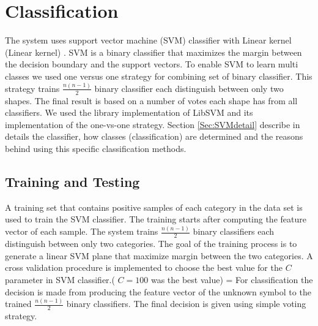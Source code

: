 \section{Classification}%
\label{sec:Classification}
The system uses support vector machine (SVM) classifier with Linear kernel (Linear kernel) \cite{libsvm}. SVM is a binary classifier that maximizes the margin between the decision boundary and the support vectors. To enable SVM to learn multi classes we used one versus one strategy for combining set of binary classifier. This strategy trains $ \frac{n(n-1)}{{2}}$ binary classifier each distinguish between only two shapes. The final result is based on a number of votes each shape has from all classifiers. We used the library implementation of LibSVM \cite{libsvm} and its implementation of the one-vs-one strategy. Section \ref{Sec:SVMdetail} describe in details the classifier, how classes (classification) are determined and the reasons behind using this specific classification methods.

\subsection {Training and Testing}
A training set that contains positive samples of each category in the data set is used to train the SVM classifier.  The training starts after computing the feature vector of each sample. The system trains $ \frac{n(n-1)}{{2}}$ binary classifiers each distinguish between only two categories. The goal of the training process is to generate a linear SVM plane that maximize margin between the two categories.  A cross validation procedure is implemented to choose the best value for the $C$ parameter in SVM classifier.( $C=100$ was the best value) 
=
For classification the decision is made from producing the feature vector of the unknown symbol to the trained $\frac{n(n-1)}{{2}}$ binary classifiers. The final decision is given using simple voting strategy. 




